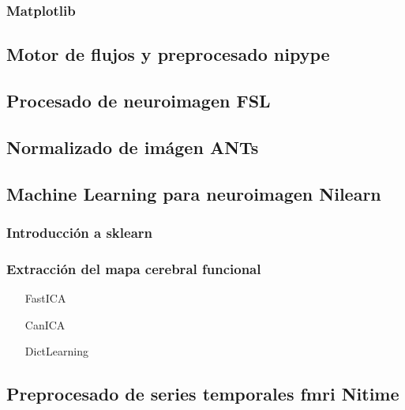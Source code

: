 \subsubsection{Matplotlib}

\subsection{Motor de flujos y preprocesado nipype}

\subsection{Procesado de neuroimagen FSL}

\subsection{Normalizado de imágen ANTs}

\subsection{Machine Learning para neuroimagen Nilearn}

\subsubsection{Introducción a sklearn}

\subsubsection{Extracción del mapa cerebral funcional}

\begin{itemize}
\item[FastICA]
\item[CanICA]
\item[DictLearning]
\end{itemize}

\subsection{Preprocesado de series temporales fmri Nitime}
